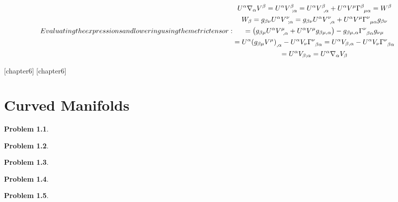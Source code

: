 \documentclass{report}
\theoremstyle{definition}
\newcounter{subpart1}[chapter1]
\begin{document}
\begin{chapter5}\label{prob: 22}
	\begin{subequations}
		Evaluating the expressions and lowering using the metric tensor:
		\begin{gather}
			U^{\alpha}\nabla_{\alpha}V^{\beta} = U^{\alpha}V^{\beta}_{\;\;;\alpha} = U^{\alpha}V^{\beta}_{\;\;,\alpha} + U^{\alpha}V^{\mu}\Gamma^{\beta}_{\;\;\mu\alpha} = W^{\beta} \\
			W_{\beta} = g_{\beta\nu}U^{\alpha}V^{\nu}_{\;\;;\alpha} = g_{\beta\nu}U^{\alpha}V^{\nu}_{\;\;,\alpha} + U^{\alpha}V^{\mu}\Gamma^{\nu}_{\;\;\mu\alpha}g_{\beta\nu} \\
			= \pqty{g_{\beta\mu}U^{\alpha}V^{\mu}_{\;\;,\alpha} + U^{\alpha}V^{\mu}g_{\beta\mu,\alpha}} - g_{\beta\mu,\alpha}\Gamma^{\nu}_{\;\;\beta\alpha}g_{\nu\mu} \\
			= U^{\alpha}\pqty{g_{\beta\mu}V^{\mu}}_{,\alpha} - U^{\alpha}V_{\nu}\Gamma^{\nu}_{\;\;\beta\alpha} = U^{\alpha}V_{\beta,\alpha} - U^{\alpha}V_{\nu}\Gamma^{\nu}_{\;\;\beta\alpha}\\
			= U^{\alpha}V_{\beta;\alpha} = U^{\alpha}\nabla_{\alpha}V_{\beta}
		\end{gather}
	\end{subequations}
\end{chapter5}

\newtheorem{chapter6}{Problem}
[chapter6]
[chapter6]

\chapter{Curved Manifolds}

\begin{chapter6}\label{prob: 1}
	
\end{chapter6}

\begin{chapter6}\label{prob: 2}
	
\end{chapter6}

\begin{chapter6}\label{prob: 3}
	
\end{chapter6}

\begin{chapter6}\label{prob: 4}
	
\end{chapter6}

\begin{chapter6}\label{prob: 5}
	
\end{chapter6}
\end{document}
